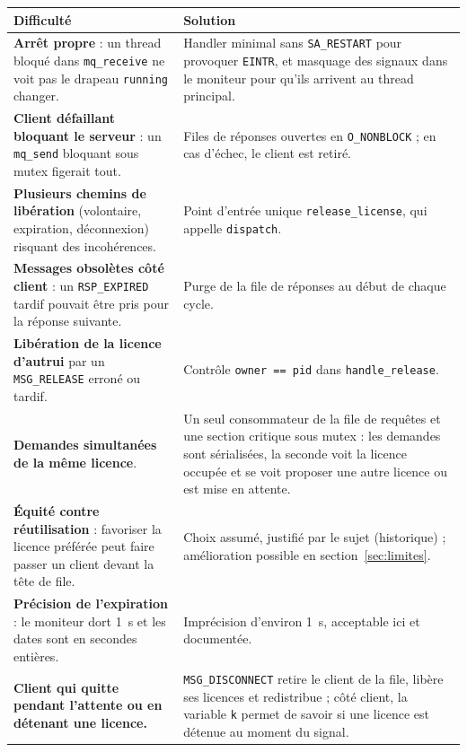 \documentclass[11pt,a4paper]{article}
\newcommand{\code}[1]{\texttt{#1}}
\begin{document}
\begin{tabularx}{\textwidth}{@{}>{\raggedright\arraybackslash}p{6.2cm}Y@{}}
\toprule
\textbf{Difficulté} & \textbf{Solution}\\
\midrule
\textbf{Arrêt propre} : un thread bloqué dans \code{mq\_receive} ne voit pas le drapeau \code{running} changer. & Handler minimal sans \code{SA\_RESTART} pour provoquer \code{EINTR}, et masquage des signaux dans le moniteur pour qu'ils arrivent au thread principal.\\
\addlinespace
\textbf{Client défaillant bloquant le serveur} : un \code{mq\_send} bloquant sous mutex figerait tout. & Files de réponses ouvertes en \code{O\_NONBLOCK} ; en cas d'échec, le client est retiré.\\
\addlinespace
\textbf{Plusieurs chemins de libération} (volontaire, expiration, déconnexion) risquant des incohérences. & Point d'entrée unique \code{release\_license}, qui appelle \code{dispatch}.\\
\addlinespace
\textbf{Messages obsolètes côté client} : un \code{RSP\_EXPIRED} tardif pouvait être pris pour la réponse suivante. & Purge de la file de réponses au début de chaque cycle.\\
\addlinespace
\textbf{Libération de la licence d'autrui} par un \code{MSG\_RELEASE} erroné ou tardif. & Contrôle \code{owner == pid} dans \code{handle\_release}.\\
\addlinespace
\textbf{Demandes simultanées de la même licence}. & Un seul consommateur de la file de requêtes et une section critique sous mutex : les demandes sont sérialisées, la seconde voit la licence occupée et se voit proposer une autre licence ou est mise en attente.\\
\addlinespace
\textbf{Équité contre réutilisation} : favoriser la licence préférée peut faire passer un client devant la tête de file. & Choix assumé, justifié par le sujet (historique) ; amélioration possible en section~\ref{sec:limites}.\\
\addlinespace
\textbf{Précision de l'expiration} : le moniteur dort 1~s et les dates sont en secondes entières. & Imprécision d'environ 1~s, acceptable ici et documentée.\\
\addlinespace
\textbf{Client qui quitte pendant l'attente ou en détenant une licence.} & \code{MSG\_DISCONNECT} retire le client de la file, libère ses licences et redistribue ; côté client, la variable \code{k} permet de savoir si une licence est détenue au moment du signal.\\
\bottomrule
\end{tabularx}
\end{document}
